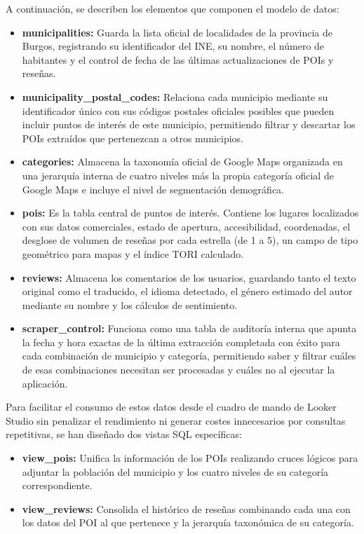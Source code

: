 A continuación, se describen los elementos que componen el modelo de datos:
\begin{itemize}
	\tightlist
	\item \textbf{municipalities:} Guarda la lista oficial de localidades de la provincia de Burgos, registrando su identificador del INE, su nombre, el número de habitantes y el control de fecha de las últimas actualizaciones de POIs y reseñas.
	\item \textbf{municipality\_postal\_codes:} Relaciona cada municipio mediante su identificador único con sus códigos postales oficiales posibles que pueden incluir puntos de interés de este municipio, permitiendo filtrar y descartar los POIs extraídos que pertenezcan a otros municipios.
	\item \textbf{categories:} Almacena la taxonomía oficial de Google Maps organizada en una jerarquía interna de cuatro niveles más la propia categoría oficial de Google Maps e incluye el nivel de segmentación demográfica.
	\item \textbf{pois:} Es la tabla central de puntos de interés. Contiene los lugares localizados con sus datos comerciales, estado de apertura, accesibilidad, coordenadas, el desglose de volumen de reseñas por cada estrella (de 1 a 5), un campo de tipo geométrico para mapas y el índice TORI calculado.
	\item \textbf{reviews:} Almacena los comentarios de los usuarios, guardando tanto el texto original como el traducido, el idioma detectado, el género estimado del autor mediante su nombre y los cálculos de sentimiento.
	\item \textbf{scraper\_control:} Funciona como una tabla de auditoría interna que apunta la fecha y hora exactas de la última extracción completada con éxito para cada combinación de municipio y categoría, permitiendo saber y filtrar cuáles de esas combinaciones necesitan ser procesadas y cuáles no al ejecutar la aplicación.
\end{itemize}

Para facilitar el consumo de estos datos desde el cuadro de mando de Looker Studio sin penalizar el rendimiento ni generar costes innecesarios por consultas repetitivas, se han diseñado dos vistas SQL específicas:
\begin{itemize}
	\tightlist
	\item \textbf{view\_pois:} Unifica la información de los POIs realizando cruces lógicos para adjuntar la población del municipio y los cuatro niveles de su categoría correspondiente.
	\item \textbf{view\_reviews:} Consolida el histórico de reseñas combinando cada una con los datos del POI al que pertenece y la jerarquía taxonómica de su categoría.
\end{itemize}

